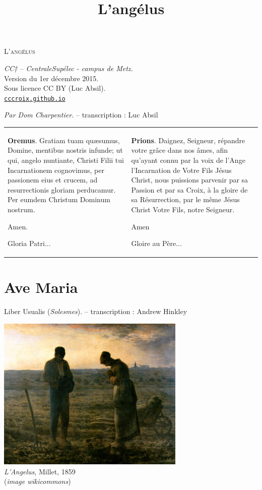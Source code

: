 \documentclass[11pt,a4paper,oneside,BCOR=0cm,DIV=13]{scrartcl}
\title{L'angélus}
\author{}
\begin{document}
\begin{center}
\Huge \textsc{L'angélus}
\vspace{0.4cm}

\normalsize \small \emph{CC† -- CentraleSupélec - campus de Metz.} \\ \small Version du 1\textup{er} décembre 2015. \\ \small Sous licence CC BY (Luc Absil). \\\href{http://cccroix.github.io}{\texttt{cccroix.github.io}}
\end{center}

\vspace{1cm}

{\flushright\emph{Par Dom Charpentier.} \small-- transcription : Luc Absil\\}

\vspace{1cm}

\begin{center}
{\small
\begin{tabular}{p{5cm} p{5cm}}
\textbf{Oremus}. Gratiam tuam quæsumus, Domine, mentibus nostris infunde; ut qui, angelo nuntiante, Christi Filii tui Incarnationem cognovimus, per passionem eius et crucem, ad resurrectionis gloriam perducamur. Per eumdem Christum Dominum nostrum. 

Amen.

Gloria Patri...
&
\textbf{Prions}. Daignez, Seigneur, répandre votre grâce dans nos âmes, afin qu'ayant connu par la voix de l'Ange l'Incarnation de Votre Fils Jésus Christ, nous puissions parvenir par sa Passion et par sa Croix, à la gloire de sa Résurrection, par le même Jésus Christ Votre Fils, notre Seigneur. 

Amen

Gloire au Père...
\end{tabular}
}
\end{center}

\newpage
\section*{Ave Maria}

\vspace{1cm}

{\flushright Liber Usualis (\emph{Solesmes}). \small-- transcription : Andrew Hinkley\\}


\begin{center}
\vspace{4cm}
\includegraphics[width=9cm]{Millet.jpg}
~\\
\emph{L'Angelus}, Millet, 1859\\ (\emph{{\small image wikicommons}})
\end{center}
\end{document}
